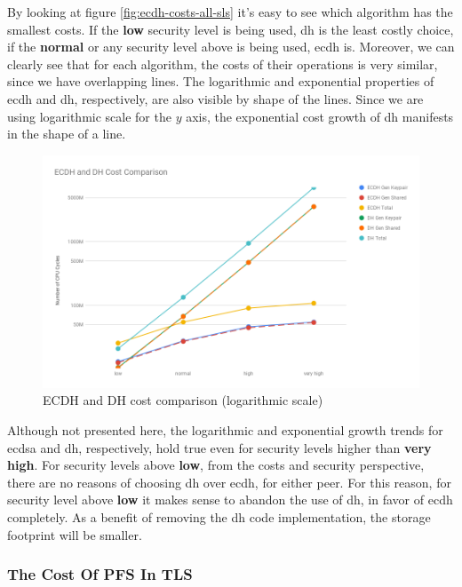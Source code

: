 \documentclass{llncs}
\begin{document}
By looking at figure \ref{fig:ecdh-costs-all-sls} it's easy to see which algorithm has the smallest costs. If the \textbf{low} security level is being used,
\gls{dh} is the least costly choice, if the \textbf{normal} or any security level above is being used, \gls{ecdh} is. Moreover, we can clearly see that
for each algorithm, the costs of their operations is very similar, since we have overlapping lines. The logarithmic and exponential properties of
\gls{ecdh} and \gls{dh}, respectively, are also visible by shape of the lines. Since we are using logarithmic scale for the $y$ axis, the
exponential cost growth of \gls{dh} manifests in the shape of a line.

\begin{figure}
  \centering
  \includegraphics[width=1.0\textwidth]{img/ecdh_dh_costs_all.png}
  \centering \caption{\label{fig:ecdh-dh-costs-all} ECDH and DH cost comparison (logarithmic scale)}
\end{figure}

Although not presented here, the logarithmic and exponential growth trends for \gls{ecdsa} and \gls{dh}, respectively, hold true even for
security levels higher than \textbf{very high}. For security levels above \textbf{low}, from the costs and security perspective, there are no
reasons of choosing \gls{dh} over \gls{ecdh}, for either peer. For this reason, for security level above \textbf{low} it makes sense to abandon the
use of \gls{dh}, in favor of \gls{ecdh} completely. As a benefit of removing the \gls{dh} code implementation, the storage footprint will be smaller.


\subsubsection{The Cost Of PFS In TLS} \label{sec:pfs-cost-in-tls}
\end{document}
